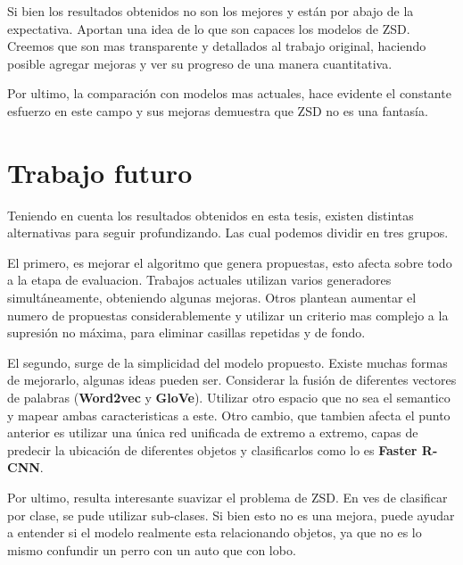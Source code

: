 Si bien los resultados obtenidos no son los mejores y están por abajo de la expectativa. Aportan una idea de lo que son capaces los modelos de ZSD. Creemos que son mas transparente y detallados al trabajo original, haciendo posible agregar mejoras y ver su progreso de una manera cuantitativa.

Por ultimo, la comparación con modelos mas actuales, hace evidente el constante esfuerzo en este campo y sus mejoras demuestra que ZSD no es una fantasía.


\section{Trabajo futuro} \label{sec:trabajo futuro}

Teniendo en cuenta los resultados obtenidos en esta tesis, existen distintas alternativas para seguir profundizando. Las cual podemos dividir en tres grupos. 

El primero, es mejorar el algoritmo que genera propuestas, esto afecta sobre todo a la etapa de evaluacion. Trabajos actuales utilizan varios generadores simultáneamente, obteniendo algunas mejoras. Otros plantean aumentar el numero de propuestas considerablemente y utilizar un criterio  mas complejo a la supresión no máxima, para eliminar casillas repetidas y de fondo.

El segundo, surge de la simplicidad del modelo propuesto. Existe muchas formas de mejorarlo, algunas ideas pueden ser. Considerar la fusión de diferentes vectores de palabras (\textbf{Word2vec} y \textbf{GloVe}). Utilizar otro espacio que no sea el semantico y mapear ambas caracteristicas a este. Otro cambio, que tambien afecta el punto anterior es utilizar una única red unificada de extremo a extremo, capas de predecir  la ubicación de diferentes objetos y clasificarlos como lo es \textbf{Faster R-CNN}.

Por ultimo, resulta interesante suavizar el problema de ZSD. En ves de clasificar por clase, se pude utilizar sub-clases. Si bien esto no es una mejora, puede ayudar a entender si el modelo realmente esta relacionando objetos, ya que no es lo mismo confundir un perro con un auto que con lobo.